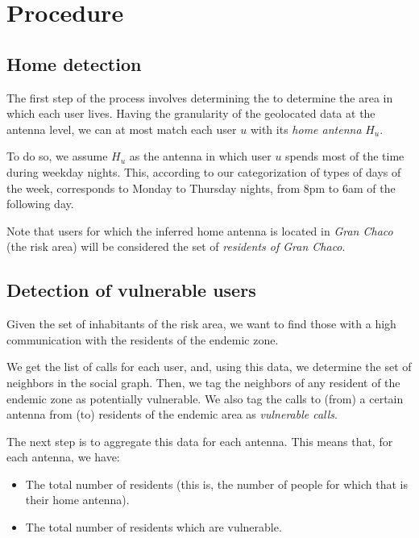 
\section{Procedure}
\subsection{Home detection}

The first step of the process involves determining the to determine the area in which each user lives. Having the granularity of the geolocated data at the antenna level, we can at most match each user $u$ with its \textit{home antenna} $H_u$.

To do so, we assume $H_u$ as the antenna in which user $u$ spends most of the time during weekday nights. This, according to our categorization of types of days of the week, corresponds to Monday to Thursday nights, from 8pm to 6am of the following day.
    
    Note that users for which the inferred home antenna is located in \textit{Gran Chaco} (the risk area) will be considered the set of \textit{residents of Gran Chaco}.

\subsection{Detection of vulnerable users}
    Given the set of inhabitants of the risk area, we want to find those with a high communication with the residents of the endemic zone.
    
    We get the list of calls for each user, and, using this data, we determine the set of neighbors in the social graph. Then, we tag the neighbors of any resident of the endemic zone as potentially vulnerable. We also tag the calls to (from) a certain antenna from (to) residents of the endemic area as \textit{vulnerable calls}.
    
    The next step is to aggregate this data for each antenna. This means that, for each antenna, we have:
    \begin{itemize}
        \item The total number of residents (this is, the number of people for which that is their home antenna).
        \item The total number of residents which are vulnerable.
    \end{itemize}
    

